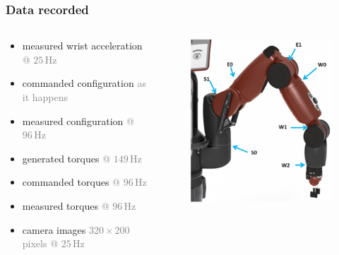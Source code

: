\documentclass{beamer}
\newcommand{\info}[1]{{\footnotesize\textcolor{gray}{#1}}}
\newcommand{\unit}[2]{\ensuremath{#1\,\mathrm{#2}}}
\begin{document}
    \begin{frame}
    	\frametitle{Data recorded}
        \begin{columns}[onlytextwidth]
            \begin{column}{.6\textwidth}
                \begin{itemize}
                    \item measured wrist acceleration \info{@ \unit{25}{Hz}}
                    \item commanded configuration \info{as it happens}
                    \item measured configuration \info{@ \unit{96}{Hz}}
                    \item generated torques \info{@ \unit{149}{Hz}}
                    \item commanded torques \info{@ \unit{96}{Hz}}
                    \item measured torques \info{@ \unit{96}{Hz}}
                    \item camera images \info{$320\times 200$ pixels @ \unit{25}{Hz}}
                \end{itemize}
            \end{column}
            \begin{column}{.4\textwidth}
                \begin{figure}
                    \centering
                    \includegraphics[width=.9\columnwidth]{figs/baxterjoints}
                \end{figure}
            \end{column}
        \end{columns}
    \end{frame}
\end{document}
